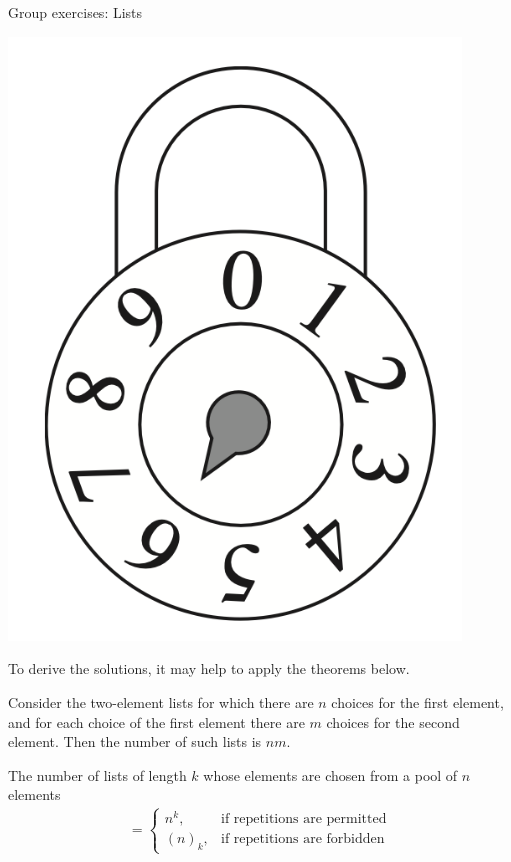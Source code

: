 \documentclass[10pt]{beamer}
\begin{document}
\begin{frame}{Group exercises: Lists}
\begin{minipage}{0.15\textwidth}
		\includegraphics[width=0.9\textwidth]{images/padlock}
    \end{minipage}
    


\vfill 
\centering

\end{frame}


\begin{frame}

To derive the solutions, it may help to apply the theorems below. 

\vfill 

\begin{myyellowbox}[title= \textbf{Multiplication Principle} (Theorem 8.2 from Scheinerman)]
Consider the two-element lists for which there are $n$ choices for the first element, and for each choice of the first element there are $m$ choices for the second element. Then the number of such lists is $nm$.
\end{myyellowbox}
\vfill 

\begin{mygreenbox}[title= Theorem 8.6 from Scheinerman]
The number of lists of length $k$ whose elements are chosen from a pool of $n$ elements 
%
\begin{align*}
= \begin{cases}
 n^k, & \text{if repetitions are permitted} \\
 (n)_k, & \text{if repetitions are forbidden}	
 \end{cases}
\end{align*}
\end{mygreenbox}

	
\end{frame}
\end{document}
